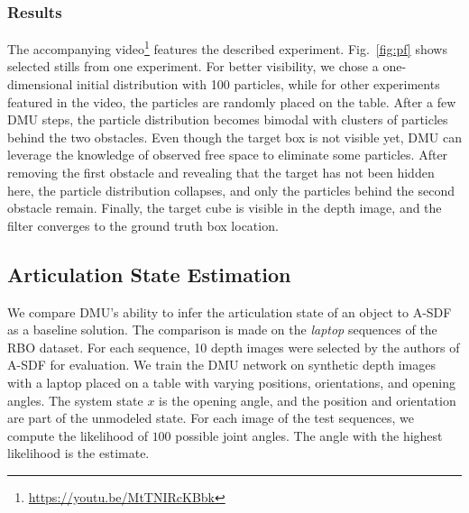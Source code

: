\documentclass[letterpaper, 10 pt, journal, twoside]{ieeetran}  %
\begin{document}
\subsubsection*{Results}
The accompanying video\footnote{\url{https://youtu.be/MtTNIRcKBbk}} features the described experiment.
Fig.~\ref{fig:pf} shows selected stills from one experiment. For better visibility, we chose a one-dimensional initial distribution with 100 particles, while for other experiments featured in the video, the particles are randomly placed on the table.
After a few DMU steps, the particle distribution becomes bimodal with clusters of particles behind the two obstacles. Even though the target box is not visible yet, DMU can leverage the knowledge of observed free space to eliminate some particles.
After removing the first obstacle and revealing that the target has not been hidden here, the particle distribution collapses, and only the particles behind the second obstacle remain.
Finally, the target cube is visible in the depth image, and the filter converges to the ground truth box location.
\subsection{Articulation State Estimation}
\label{subsec:benchmark_comparison}
We compare DMU's ability to infer the articulation state of an object to A-SDF as a baseline solution. The comparison is made on the \textit{laptop} sequences of the RBO dataset. For each sequence, 10 depth images were selected by the authors of A-SDF for evaluation.
We train the DMU network on synthetic depth images with a laptop placed on a table with varying positions, orientations, and opening angles. The system state $x$ is the opening angle, and the position and orientation are part of the unmodeled state.
For each image of the test sequences, we compute the likelihood of $100$ possible joint angles. The angle with the highest likelihood is the estimate.
\end{document}
